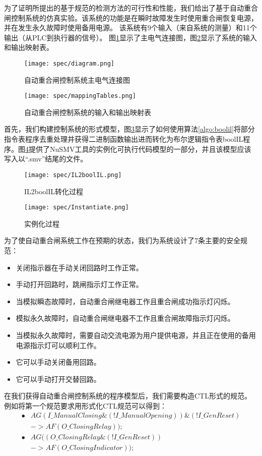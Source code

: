 为了证明所提出的基于规范的检测方法的可行性和性能，我们给出了基于自动重合闸控制系统的仿真实验。该系统的功能是在瞬时故障发生时使用重合闸恢复电源，并在发生永久故障时使用备用电源。 该系统有9个输入（来自系统的测量）和11个输出（从PLC到执行器的信号）。 图\ref {fig29}显示了主电气连接图，图\ref {fig210}显示了系统的输入和输出映射表。

\begin{figure}[!htb]
\centering
\texttt{[image: spec/diagram.png]}
\caption{自动重合闸控制系统主电气连接图}
\label{fig29}
\end{figure}

\begin{figure}[!htb]
\centering
\texttt{[image: spec/mappingTables.png]}
\caption{自动重合闸控制系统的输入和输出映射表}
\label{fig210}
\end{figure}

首先，我们构建控制系统的形式模型，图\ref {fig211}显示了如何使用算法\ref{algo:boolil}将部分指令表程序去重处理并获得二进制函数输出进而转化为布尔逻辑指令表boolIL程序。图\ref {fig212}提供了NuSMV工具的实例化可执行代码模型的一部分，并且该模型应该写入以“.smv”结尾的文件。
\begin{figure}[!htb]{}
\centering
\texttt{[image: spec/IL2boolIL.png]}
\caption{IL2boolIL转化过程}
\label{fig211}
\end{figure}

\begin{figure}[!htb]
\centering
\texttt{[image: spec/Instantiate.png]}
\caption{实例化过程}
\label{fig212}
\end{figure}

为了使自动重合闸系统工作在预期的状态，我们为系统设计了7条主要的安全规范：
\begin{itemize}
	\item 关闭指示器在手动关闭回路时工作正常。
	\item 手动打开回路时，跳闸指示灯工作正常。
	\item 当模拟瞬态故障时，自动重合闸继电器工作且重合闸成功指示灯闪烁。
	\item 模拟永久故障时，自动重合闸继电器不工作且重合闸故障指示灯闪烁。
	\item 当模拟永久故障时，需要自动交流电源为用户提供电源，并且正在使用的备用电源指示灯可以顺利工作。
	\item 它可以手动关闭备用回路。
	\item 它可以手动打开交替回路。
\end{itemize}

在我们获得自动重合闸控制系统的程序模型后，我们需要构造CTL形式的规范。例如将第一个规范要求用形式化CTL规范可以得到：
\[\begin{split}
\bullet &AG(I\_ManualClosing\&(! I\_ManualOpening) )\&(! I\_GenReset) \\&-> AF(O\_ ClosingRelay));\\\bullet &AG((O\_ ClosingRelay \& (! I\_GenReset)) \\&-> AF(O\_ClosingIndicator));
\end{split}
\]

